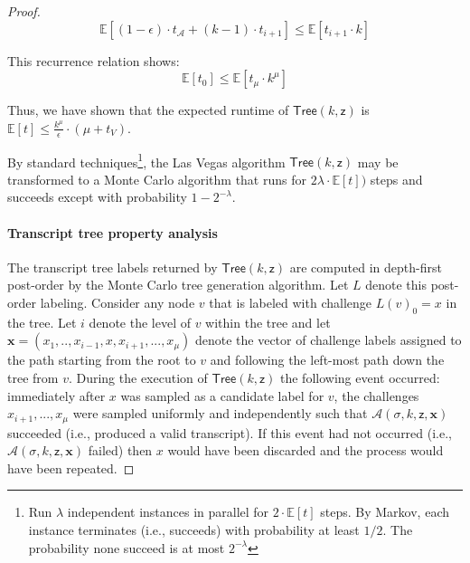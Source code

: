 \begin{proof}
$$ \mathbb{E}[(1- \epsilon)\cdot t_\mathcal{A} +  (k-1)\cdot t_{i+1}]  \leq \mathbb{E}[t_{i+1} \cdot k]$$

This recurrence relation shows: 
$$\mathbb{E}[t_0] \leq \mathbb{E}[t_\mu \cdot k^\mu] $$

Thus, we have shown that the expected runtime of $\mathsf{Tree}(k,\mathsf{z})$ is $\mathbb{E}[t] \leq \frac{k^\mu}{\epsilon} \cdot (\mu + t_V)$.

\medskip 

By standard techniques\footnote{Run $\lambda$ independent instances in parallel for $2 \cdot \mathbb{E}[t]$ steps. By Markov, each instance terminates (i.e., succeeds) with probability at least $1/2$. The probability none succeed is at most $2^{-\lambda}$}, the Las Vegas algorithm $\mathsf{Tree}(k,\mathsf{z})$ may be transformed to a Monte Carlo algorithm that runs for $2\lambda \cdot \mathbb{E}[t])$ steps and succeeds except with probability $1-2^{-\lambda}$.

\paragraph{Transcript tree property analysis} 
The transcript tree labels returned by $\mathsf{Tree}(k,\mathsf{z})$ are computed in depth-first post-order by the Monte Carlo tree generation algorithm. Let $L$ denote this post-order labeling. Consider any node $v$ that is labeled with challenge $L(v)_0 = x$ in the tree. Let $i$ denote the level of $v$ within the tree and let $\mathbf{x} = (x_1,..,x_{i-1}, x, x_{i+1},...,x_\mu)$ denote the vector of challenge labels assigned to the path starting from the root to $v$ and following the left-most path down the tree from $v$. During the execution of $\mathsf{Tree}(k, \mathsf{z})$ the following event occurred: immediately after $x$ was sampled as a candidate label for $v$, the challenges $x_{i+1},...,x_\mu$ were sampled uniformly and independently such that $\mathcal{A}(\sigma, k, \mathsf{z}, \mathbf{x})$ succeeded (i.e., produced a valid transcript). If this event had not occurred (i.e., $\mathcal{A}(\sigma, k, \mathsf{z}, \mathbf{x})$ failed) then $x$ would have been discarded and the process would have been repeated. 


\end{proof}
